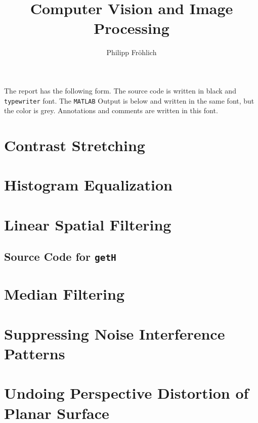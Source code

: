 \documentclass[12pt,a4paper]{scrartcl}
\author{Philipp Fröhlich}
\title{Computer Vision and Image Processing}
\begin{document}
\maketitle
\thispagestyle{empty}

The report has the following form. The source code is written in black and \texttt{typewriter} font. The \texttt{MATLAB} Output is below and written in the same font, but the color is {\color{lightgray} grey}. Annotations and comments are written in this font.
\tableofcontents
\newpage

\section{Contrast Stretching}
\pagestyle{fancy}

\newpage

\section{Histogram Equalization}

\newpage

\section{Linear Spatial Filtering}

\subsection*{Source Code for \texttt{getH}}

\newpage

\section{Median Filtering}

\newpage

\section{Suppressing Noise Interference Patterns}

\newpage

\section{Undoing Perspective Distortion of Planar Surface}

\end{document}
